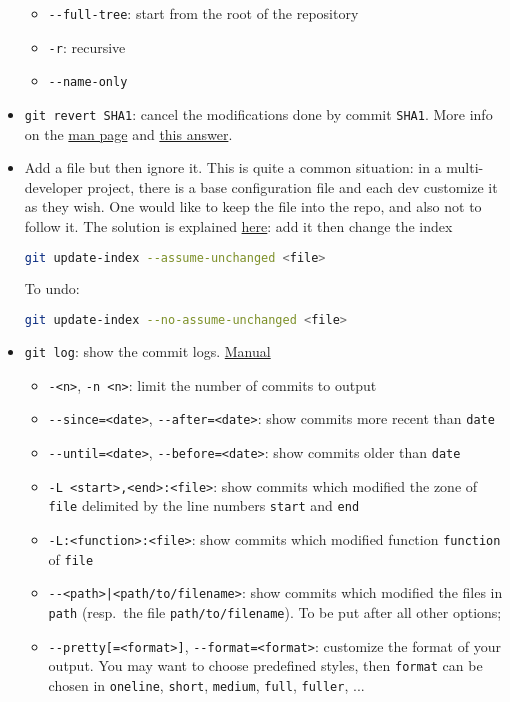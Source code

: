 \documentclass[a4paper,12pt,%
              final%
              ]{article}
\begin{document}
\begin{itemize}
\begin{itemize}
      \item \verb|--full-tree|: start from the root of the repository
      \item \verb|-r|: recursive
      \item \verb|--name-only|
    \end{itemize}
  \item \texttt{git revert SHA1}: cancel the modifications done by commit \texttt{SHA1}. More info on the \href{https://git-scm.com/docs/git-revert}{man page} and \href{https://stackoverflow.com/a/4114122}{this answer}.
  \item Add a file but then ignore it. This is quite a common situation: in a multi-developer project, there is a base configuration file and each dev customize it as they wish. One would like to keep the file into the repo, and also not to follow it. The solution is explained \href{https://stackoverflow.com/questions/3319479/can-i-git-commit-a-file-and-ignore-its-content-changes}{here}: add it then change the index
\begin{lstlisting}[language=bash]
git update-index --assume-unchanged <file>
\end{lstlisting}
    To undo:
\begin{lstlisting}[language=bash]
git update-index --no-assume-unchanged <file>
\end{lstlisting}
  \item \texttt{git log}: show the commit logs. \href{https://git-scm.com/docs/git-log}{Manual}
    \begin{itemize}
      \item \texttt{-<n>}, \texttt{-n <n>}: limit the number of commits to output
      \item \verb|--since=<date>|, \verb|--after=<date>|: show commits more recent than \texttt{date}
      \item \verb|--until=<date>|, \verb|--before=<date>|: show commits older than \texttt{date}
      \item \verb|-L <start>,<end>:<file>|: show commits which modified the zone of \texttt{file} delimited by the line numbers \texttt{start} and \texttt{end}
      \item \verb|-L:<function>:<file>|: show commits which modified function \texttt{function} of \texttt{file}
      \item \verb!--<path>|<path/to/filename>!: show commits which modified the files in \texttt{path} (resp.\ the file \verb|path/to/filename|). To be put after all other options;
      \item \verb|--pretty[=<format>]|, \verb|--format=<format>|: customize the format of your output. You may want to choose predefined styles, then \texttt{format} can be chosen in \texttt{oneline}, \texttt{short}, \texttt{medium}, \texttt{full}, \texttt{fuller}, ...

\end{itemize}
\end{itemize}
\end{document}
